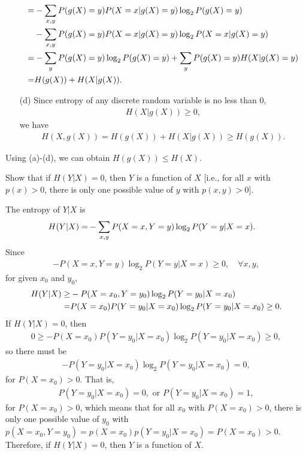 \documentclass{assignment}
\begin{document}
\begin{pf}
\begin{itemize}
\begin{align}
            \notag=&-\sum_{x,y}P(g(X)=y)P(X=x\vert g(X)=y)\log_2P(g(X)=y)\\
            \notag&-\sum_{x,y}P(g(X)=y)P(X=x\vert g(X)=y)\log_2P(X=x\vert g(X)=y)\\
            \notag=&-\sum_yP(g(X)=y)\log_2P(g(X)=y)+\sum_yP(g(X)=y)H(X\vert g(X)=y)\\
            \notag=&H(g(X))+H(X\vert g(X)).
        \end{align}
        \item[(d)] Since entropy of any discrete random variable is no less than $0$,
        \begin{align}
            H(X\vert g(X))\geq 0,
        \end{align}
        we have
        \begin{align}
            H(X,g(X))=H(g(X))+H(X\vert g(X))\geq H(g(X)).
        \end{align}
    \end{itemize}
    Using (a)-(d), we can obtain $H(g(X))\leq H(X)$.
\end{pf}

\begin{prob}
    Show that if $H(Y\vert X)=0$, then $Y$ is a function of $X$ [i.e., for all $x$ with $p(x)>0$, there is only one possible value of $y$ with $p(x,y)>0$].
\end{prob}
\begin{pf}
    The entropy of $Y\vert X$ is
    \begin{align}
        \notag H(Y\vert X)=&-\sum_{x,y}P(X=x,Y=y)\log_2P(Y=y\vert X=x).
    \end{align}
    Since
    \begin{align}
        -P(X=x,Y=y)\log_2P(Y=y\vert X=x)\geq 0,\quad\forall x,y,
    \end{align}
    for given $x_0$ and $y_0$,
    \begin{align}
        \notag H(Y\vert X)\geq&-P(X=x_0,Y=y_0)\log_2P(Y=y_0\vert X=x_0)\\
        =&P(X=x_0)P(Y=y_0\vert X=x_0)\log_2P(Y=y_0\vert X=x_0)\geq 0.
    \end{align}
    If $H(Y\vert X)=0$, then
    \begin{align}
        0\geq-P(X=x_0)P(Y=y_0\vert X=x_0)\log_2P(Y=y_0\vert X=x_0)\geq 0,
    \end{align}
    so there must be
    \begin{align}
        -P(Y=y_0\vert X=x_0)\log_2P(Y=y_0\vert X=x_0)=0,
    \end{align}
    for $P(X=x_0)>0$.
    That is,
    \begin{align}
        P(Y=y_0\vert X=x_0)=0,\text{ or }P(Y=y_0\vert X=x_0)=1,
    \end{align}
    for $P(X=x_0)>0$, which means that for all $x_0$ with $P(X=x_0)>0$, there is only one possible value of $y_0$ with $p(X=x_0,Y=y_0)=p(X=x_0)p(Y=y_0\vert X=x_0)=P(X=x_0)>0$.\\
    Therefore, if $H(Y\vert X)=0$, then $Y$ is a function of $X$.
\end{pf}
\end{document}
